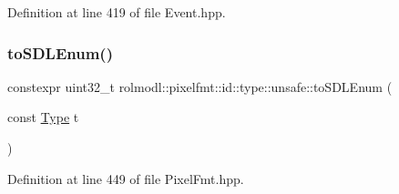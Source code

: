 Definition at line 419 of file Event.\+hpp.

\mbox{\label{namespacerolmodl_1_1pixelfmt_1_1id_1_1type_1_1unsafe_ab1ffad46f2336264c01ee66bdd90a5c0}} 
\subsubsection{\texorpdfstring{toSDLEnum()}{toSDLEnum()}}
{\footnotesize\ttfamily constexpr uint32\+\_\+t rolmodl\+::pixelfmt\+::id\+::type\+::unsafe\+::to\+S\+D\+L\+Enum (\begin{DoxyParamCaption}\item[{const \mbox{\hyperlink{namespacerolmodl_1_1pixelfmt_1_1id_acacda2442a2997fe425e2faa4e5d002b}{Type}}}]{t }\end{DoxyParamCaption})\hspace{0.3cm}{\ttfamily [noexcept]}}



Definition at line 449 of file Pixel\+Fmt.\+hpp.

